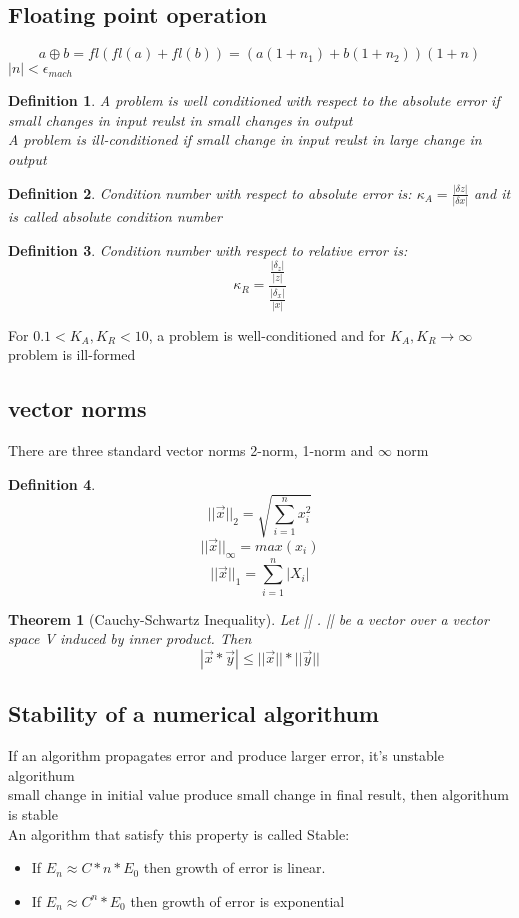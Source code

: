 \documentclass[10pt]{article}
\theoremstyle{break}
\newtheorem{thm}{Theorem}[subsection]
\newtheorem{defn}{Definition}[subsection]
\begin{document}
{    \subsection{Floating point operation}
        $$a \oplus b=fl(fl(a)+fl(b))=(a(1+n_1)+b(1+n_2))(1+n)$$ $|n|<\epsilon_{mach}$
    \begin{defn}
        A problem is well conditioned with respect to the absolute error if small changes in input reulst in small changes in output\\
        A problem is ill-conditioned if small change in input reulst in large change in output
    \end{defn}
    \begin{defn}
        Condition number with respect to absolute error is:
        $\kappa_A=\frac{|\delta z|}{|\delta x|}$ and it is called absolute condition number 
    \end{defn}
    \begin{defn}
        Condition number with respect to relative error is:
        $$\kappa _R=\frac{\frac{|\delta_z|}{|z|}}{\frac{|\delta_x|}{|x|}}$$
        
    \end{defn}
    For $0.1<K_A, K_R<10$, a problem is well-conditioned and for $K_A, K_R \rightarrow \infty$ problem is ill-formed
    \subsection{vector norms}
    There are three standard vector norms 2-norm, 1-norm and $\infty$ norm
    \begin{defn}
        $$|| \vec{x}||_2=\sqrt{\sum_{i=1}^n x_i^2}$$
        $$|| \vec{x}||_\infty=max(x_i)$$
        $$|| \vec{x}||_1=\sum_{i=1}^n|X_i|$$
    \end{defn}
    \begin{thm}[Cauchy-Schwartz Inequality]
        Let || . || be a vector over a vector space V induced by inner product. Then 
        $$|\vec{x}*\vec{y}|\leq ||\vec{x} ||* ||\vec{y} ||$$
    \end{thm}
    \subsection{Stability of a numerical algorithum}
        If an algorithm propagates error and produce larger error, it's unstable algorithum\\
        small change in initial value produce small change in final result, then algorithum is stable\\
        An algorithm that satisfy this property is called Stable:
        \begin{itemize}
            \item If $E_n \approx C*n*E_0$ then growth of error is linear.
            \item If $E_n \approx C^n*E_0$ then growth of error is exponential
        \end{itemize}
}
\end{document}
